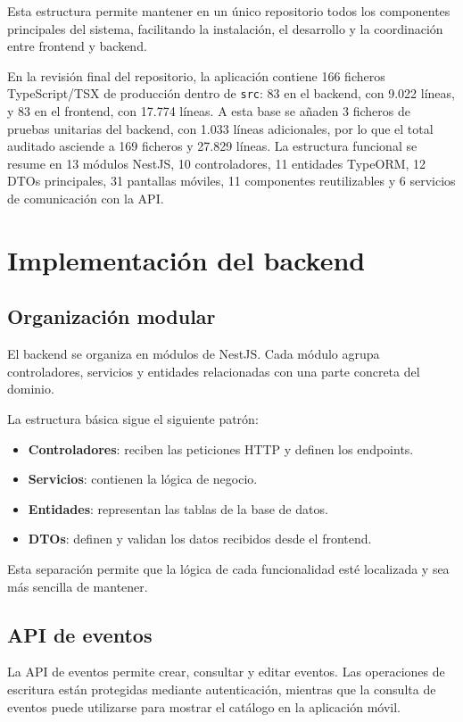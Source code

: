 Esta estructura permite mantener en un único repositorio todos los componentes principales del sistema, facilitando la instalación, el desarrollo y la coordinación entre frontend y backend.

En la revisión final del repositorio, la aplicación contiene 166 ficheros TypeScript/TSX de producción dentro de \texttt{src}: 83 en el backend, con 9.022 líneas, y 83 en el frontend, con 17.774 líneas. A esta base se añaden 3 ficheros de pruebas unitarias del backend, con 1.033 líneas adicionales, por lo que el total auditado asciende a 169 ficheros y 27.829 líneas. La estructura funcional se resume en 13 módulos NestJS, 10 controladores, 11 entidades TypeORM, 12 DTOs principales, 31 pantallas móviles, 11 componentes reutilizables y 6 servicios de comunicación con la API.

\section{Implementación del backend}

\subsection{Organización modular}

El backend se organiza en módulos de NestJS. Cada módulo agrupa controladores, servicios y entidades relacionadas con una parte concreta del dominio.

La estructura básica sigue el siguiente patrón:

\begin{itemize}
    \item \textbf{Controladores}: reciben las peticiones HTTP y definen los endpoints.
    \item \textbf{Servicios}: contienen la lógica de negocio.
    \item \textbf{Entidades}: representan las tablas de la base de datos.
    \item \textbf{DTOs}: definen y validan los datos recibidos desde el frontend.
\end{itemize}

Esta separación permite que la lógica de cada funcionalidad esté localizada y sea más sencilla de mantener.

\subsection{API de eventos}

La API de eventos permite crear, consultar y editar eventos. Las operaciones de escritura están protegidas mediante autenticación, mientras que la consulta de eventos puede utilizarse para mostrar el catálogo en la aplicación móvil.

